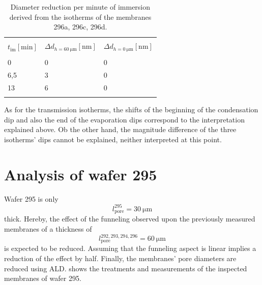 \documentclass[thesis.tex]{subfiles}
\begin{document}
          \begin{table}
            \caption{Diameter reduction per minute of immersion derived from the isotherms of the membranes 296a, 296c, 296d.}
            \label{tbl:etch_rate}
            \begin{tabu} {X[r]X[r]X[r]}
              \unitoprule \\
              \textbf{$t_\mathrm{im} [\si{\minute}]$} & \textbf{$\Delta d_{h=\SI{60}{\micro\meter}} [\si{\nano\meter}]$} & \textbf{$\Delta d_{h=\SI{0}{\micro\meter}} [\si{\nano\meter}]$} \\
              \unimidrule \\
              0 &0  &0 \\
              6,5 &3  &0  \\
              13  &6  &0  \\
              \unitoprule \\
            \end{tabu}
          \end{table}

          As for the transmission isotherms, the shifts of the beginning of the condensation dip and also the end of the evaporation dips correspond to the interpretation explained above. Ob the other hand, the magnitude difference of the three isotherms' dips cannot be explained, neither interpreted at this point.

          


    \section{Analysis of wafer 295}
    \label{sec:wafer295}

        Wafer 295 is only
        \begin{equation}
            l^{295}_\mathrm{pore}=\SI{30}{\micro\meter}
        \end{equation}
        thick. Hereby, the effect of the funneling observed upon the previously measured membranes of a thickness of
        \begin{equation}
            l^{292,293,294,296}_\mathrm{pore}=\SI{60}{\micro\meter}
        \end{equation}
        is expected to be reduced. Assuming that the funneling aspect is linear implies a reduction of the effect by half.
        Finally, the membranes' pore diameters are reduced using ALD.  shows the treatments and measurements of the inspected membranes of wafer 295.
\end{document}
